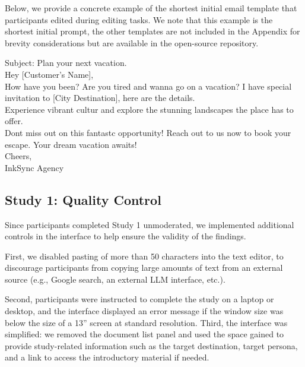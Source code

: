 \documentclass[manuscript]{acmart}
\newenvironment{myjsonblock}[1]{%
    \begin{center}
    \begin{minipage}{0.5\textwidth}
    \begin{mdframed}[
        linecolor=black,
        linewidth=1pt,
        innertopmargin=6pt,
        innerbottommargin=6pt,
        innerrightmargin=10pt,
        innerleftmargin=10pt,
        frametitle=#1,
        frametitlebackgroundcolor=slackbrown, %
        frametitlefont=\color{white}\bfseries, %
    ]
}{%
    \end{mdframed}
    \end{minipage}
    \end{center}
}
\begin{document}
Below, we provide a concrete example of the shortest initial email template that participants edited during editing tasks. We note that this example is the shortest initial prompt, the other templates are not included in the Appendix for brevity considerations but are available in the open-source repository. 

\begin{myjsonblock}{Initial Email Template - Study 1 (1 of 3)}
Subject: Plan your next vacation.\\

Hey [Customer's Name],\\

How have you been? Are you tired and wanna go on a vacation? I have special invitation to [City Destination], here are the details.\\

Experience vibrant cultur and explore the stunning landscapes the place has to offer.\\

Dont miss out on this fantastc opportunity! Reach out to us now to book your escape. Your dream vacation awaits!\\

Cheers,\\
InkSync Agency
\end{myjsonblock}

\subsection{Study 1: Quality Control} \label{sec:study1_quality_control}

Since participants completed  Study 1 unmoderated, we implemented additional controls in the interface to help ensure the validity of the findings.

First, we disabled pasting of more than 50 characters into the text editor, to discourage participants from copying large amounts of text from an external source (e.g., Google search, an external LLM interface, etc.).

Second, participants were instructed to complete the study on a laptop or desktop, and the interface displayed an error message if the window size was below the size of a 13'' screen at standard resolution. Third, the interface was simplified: we removed the document list panel and used the space gained to provide study-related information such as the target destination, target persona, and a link to access the introductory material if needed.
\end{document}

